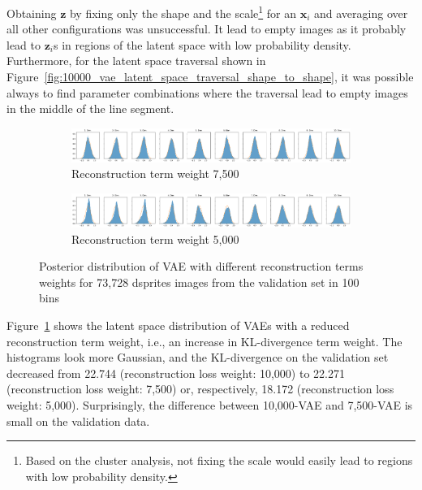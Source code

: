 Obtaining $\bm{z}$ by fixing only the shape and the scale\footnote{Based on the cluster analysis, not fixing the scale would easily lead to regions with low probability density.} for an $\bm{x}_i$ and averaging over all other configurations was unsuccessful.
It lead to empty images as it probably lead to $\bm{z}_i$s in regions of the latent space with low probability density.
Furthermore, for the latent space traversal shown in Figure~\ref{fig:10000_vae_latent_space_traversal_shape_to_shape}, it was possible always to find parameter combinations where the traversal lead to empty images in the middle of the line segment.

\begin{figure}
    \centering
    \begin{subfigure}{\textwidth}
        \centering
        \includegraphics[width=\textwidth]{images/latent_space_entanglement/vae_dsprites_lf_7500_dist.png}
        \caption{Reconstruction term weight 7,500}
    \end{subfigure}
    \begin{subfigure}{\textwidth}
        \centering
        \includegraphics[width=\textwidth]{images/latent_space_entanglement/vae_dsprites_lf_5000_dist.png}
        \caption{Reconstruction term weight 5,000}
    \end{subfigure}
    \caption[VAE Latent Space Distribution - Different Reconstruction Term Weights]{Posterior distribution of VAE with different reconstruction terms weights for 73,728 dsprites images from the validation set in 100 bins}
    \label{fig:7500_5000_vae_latent_space_distribution_scales_and_shapes}
\end{figure}

Figure~\ref{fig:7500_5000_vae_latent_space_distribution_scales_and_shapes} shows the latent space distribution of \acp{VAE} with a reduced reconstruction term weight, i.e., an increase in \ac{KL-divergence} term weight.
The histograms look more Gaussian, and the \ac{KL-divergence} on the validation set decreased from 22.744 (reconstruction loss weight: 10,000) to 22.271 (reconstruction loss weight: 7,500) or, respectively, 18.172 (reconstruction loss weight: 5,000).
Surprisingly, the difference between 10,000-\ac{VAE} and 7,500-\ac{VAE} is small on the validation data.

